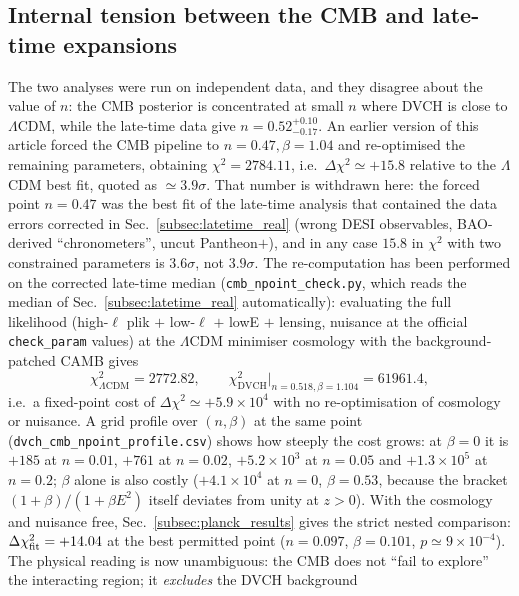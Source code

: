 \documentclass[pdflatex,sn-mathphys-num]{sn-jnl}%
\begin{document}
\subsection{Internal tension between the CMB and late-time expansions}
\label{subsec:tension}

The two analyses were run on independent data, and they disagree about
the value of $n$: the CMB posterior is concentrated at small $n$
where DVCH is close to $\Lambda$CDM, while the late-time data give
$n=0.52^{+0.10}_{-0.17}$. An earlier version of this article forced the
CMB pipeline to $n=0.47,\beta=1.04$ and re-optimised the remaining
parameters, obtaining $\chi^2=2784.11$, i.e.\ $\Delta\chi^2\simeq+15.8$
relative to the $\Lambda$CDM best fit, quoted as $\simeq3.9\sigma$. That
number is withdrawn here: the forced point $n=0.47$ was the best fit of
the late-time analysis that contained the data errors corrected in
Sec.~\ref{subsec:latetime_real} (wrong DESI observables, BAO-derived
``chronometers'', uncut Pantheon$+$), and in any case $15.8$ in $\chi^2$
with two constrained parameters is $3.6\sigma$, not $3.9\sigma$.
The re-computation has been performed on the corrected late-time median
(\texttt{cmb\_npoint\_check.py}, which reads the median of
Sec.~\ref{subsec:latetime_real} automatically): evaluating the full
likelihood (high-$\ell$ plik $+$ low-$\ell$ $+$ lowE $+$ lensing, nuisance
at the official \texttt{check\_param} values) at the $\Lambda$CDM
minimiser cosmology with the background-patched CAMB gives
\begin{equation}
\chi^2_{\Lambda\mathrm{CDM}} = 2772.82,\qquad
\chi^2_{\mathrm{DVCH}}\big|_{n=0.518,\beta=1.104} = 61961.4,
\end{equation}
i.e.\ a fixed-point cost of $\Delta\chi^2\simeq+5.9\times10^4$ with no
re-optimisation of cosmology or nuisance. A grid profile over $(n,\beta)$
at the same point (\texttt{dvch\_cmb\_npoint\_profile.csv}) shows how
steeply the cost grows: at $\beta=0$ it is $+185$ at $n=0.01$, $+761$ at
$n=0.02$, $+5.2\times10^3$ at $n=0.05$ and $+1.3\times10^5$ at
$n=0.2$; $\beta$ alone is also costly ($+4.1\times10^4$ at $n=0$,
$\beta=0.53$, because the bracket $(1+\beta)/(1+\beta E^2)$ itself
deviates from unity at $z>0$). With the cosmology and nuisance free,
Sec.~\ref{subsec:planck_results} gives the strict nested comparison:
$\Delta\chi^2_{\rm fit}=+14.04$ at the best permitted point
($n=0.097$, $\beta=0.101$, $p\simeq9\times10^{-4}$).
The physical reading is now unambiguous: the CMB does not ``fail to
explore'' the interacting region; it \emph{excludes} the DVCH background
\end{document}
